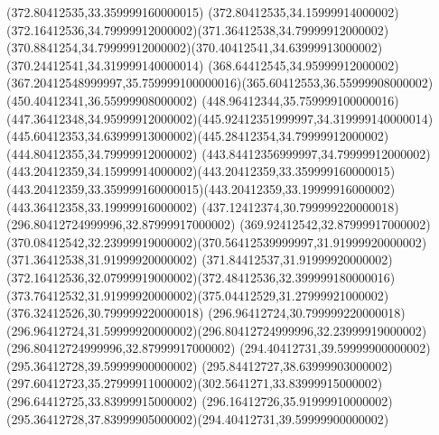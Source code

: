 {{	\lineto(372.80412535,33.359999160000015)
	\curveto(372.80412535,34.15999914000002)(372.16412536,34.79999912000002)(371.36412538,34.79999912000002)
	\curveto(370.8841254,34.79999912000002)(370.40412541,34.63999913000002)(370.24412541,34.319999140000014)
	\curveto(368.64412545,34.95999912000002)(367.20412548999997,35.759999100000016)(365.60412553,36.55999908000002)
	\lineto(450.40412341,36.55999908000002)
	\curveto(448.96412344,35.759999100000016)(447.36412348,34.95999912000002)(445.92412351999997,34.319999140000014)
	\curveto(445.60412353,34.63999913000002)(445.28412354,34.79999912000002)(444.80412355,34.79999912000002)
	\curveto(443.84412356999997,34.79999912000002)(443.20412359,34.15999914000002)(443.20412359,33.359999160000015)
	\curveto(443.20412359,33.359999160000015)(443.20412359,33.19999916000002)(443.36412358,33.19999916000002)
	\lineto(437.12412374,30.799999220000018)
	\closepath
	\moveto(296.80412724999996,32.87999917000002)
	\lineto(369.92412542,32.87999917000002)
	\curveto(370.08412542,32.23999919000002)(370.56412539999997,31.91999920000002)(371.36412538,31.91999920000002)
	\curveto(371.84412537,31.91999920000002)(372.16412536,32.07999919000002)(372.48412536,32.399999180000016)
	\curveto(373.76412532,31.91999920000002)(375.04412529,31.27999921000002)(376.32412526,30.799999220000018)
	\lineto(296.96412724,30.799999220000018)
	\curveto(296.96412724,31.59999920000002)(296.80412724999996,32.23999919000002)(296.80412724999996,32.87999917000002)
	\closepath
	\moveto(294.40412731,39.59999900000002)
	\lineto(295.36412728,39.59999900000002)
	\curveto(295.84412727,38.63999903000002)(297.60412723,35.27999911000002)(302.5641271,33.83999915000002)
	\lineto(296.64412725,33.83999915000002)
	\curveto(296.16412726,35.91999910000002)(295.36412728,37.83999905000002)(294.40412731,39.59999900000002)
	\closepath
}
}
{
}
{
}
